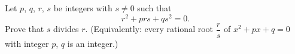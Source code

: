 Let $p$, $q$, $r$, $s$ be integers with $s\neq0$ such that
\[
r^2+prs+qs^2=0 .
\]
Prove that $s$ divides $r$. (Equivalently: every rational root $\dfrac{r}{s}$ of $x^2+px+q=0$ with integer $p$, $q$ is an integer.)
